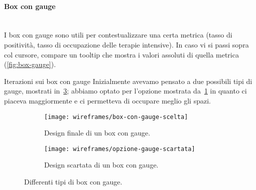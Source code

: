 \documentclass[../../../main.tex]{subfiles}
\begin{document}
\paragraph{Box con gauge}\mbox{}\\
I box con gauge sono utili per contestualizzare una certa metrica (tasso di positività, tasso di occupazione delle terapie intensive). In caso vi si passi sopra col cursore, compare un tooltip che mostra i valori assoluti di quella metrica (\ref{fig:box-gauge}).

\begin{bclogo}{Iterazioni sui box con gauge}
    Inizialmente avevamo pensato a due possibili tipi di gauge, mostrati in~\ref{fig:opzioni-gauge}; abbiamo optato per l'opzione mostrata da~\ref{fig:opzione-gauge-finale} in quanto ci piaceva maggiormente e ci permetteva di occupare meglio gli spazi.

    \begin{figure}[H]
    \begin{subfigure}[b]{0.5\textwidth}
        \centering
        \texttt{[image: wireframes/box-con-gauge-scelta]}
        \caption{Design finale di un box con gauge.}
        \label{fig:opzione-gauge-finale}
    \end{subfigure}
\hfill
    \begin{subfigure}[b]{0.5\textwidth}
        \centering
        \texttt{[image: wireframes/opzione-gauge-scartata]}
        \caption{Design scartata di un box con gauge.}
        \label{fig:opzione-gauge-scartata}
    \end{subfigure}
    \caption{Differenti tipi di box con gauge.}
    \label{fig:opzioni-gauge}
\end{figure}

\end{bclogo}

\clearpage
\end{document}
